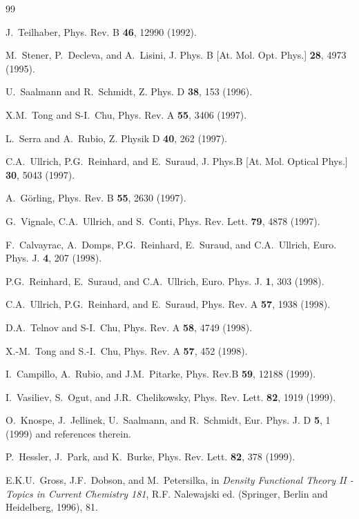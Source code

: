 \documentclass[aps,preprint]{revtex4}%
\begin{document}
\begin{thebibliography}{99}                                                                                               %


J.~Teilhaber, Phys. Rev. B \textbf{46}, 12990 (1992).

M.~Stener, P.~Decleva, and A.~Lisini, J. Phys. B [At. Mol.
Opt. Phys.] \textbf{28}, 4973 (1995).

U.~Saalmann and R.~Schmidt, Z. Phys. D \textbf{38}, 153 (1996).

X.M.~Tong and S-I.~Chu, Phys. Rev. A \textbf{55}, 3406 (1997).

L.~Serra and A.~Rubio, Z. Physik D \textbf{40}, 262 (1997).

C.A.~Ullrich, P.G.~Reinhard, and E.~Suraud, J. Phys.B [At.
Mol. Optical Phys.] \textbf{30}, 5043 (1997).

A.~G\"orling, Phys. Rev. B \textbf{55}, 2630 (1997).

G.~Vignale, C.A.~Ullrich, and S.~Conti, Phys. Rev. Lett.
\textbf{79}, 4878 (1997).

F.~Calvayrac, A.~Domps, P.G.~Reinhard, E.~Suraud, and
C.A.~Ullrich, Euro. Phys. J. \textbf{4}, 207 (1998).

P.G.~Reinhard, E.~Suraud, and C.A.~Ullrich, Euro. Phys.
J. \textbf{1}, 303 (1998).

C.A.~Ullrich, P.G.~Reinhard, and E.~Suraud, Phys. Rev. A
\textbf{57}, 1938 (1998).

D.A.~Telnov and S-I.~Chu, Phys. Rev. A \textbf{58}, 4749 (1998).

X.-M.~Tong and S.-I.~Chu, Phys. Rev. A \textbf{57}, 452 (1998).

I.~Campillo, A.~Rubio, and J.M.~Pitarke, Phys. Rev.B
\textbf{59}, 12188 (1999).

I.~Vasiliev, S.~Ogut, and J.R.~Chelikowsky, Phys. Rev.
Lett. \textbf{82}, 1919 (1999).

O.~Knospe, J.~Jellinek, U.~Saalmann, and R.~Schmidt, Eur.
Phys. J. D \textbf{5}, 1 (1999) and references therein.

P.~Hessler, J.~Park, and K.~Burke, Phys. Rev. Lett.
\textbf{82}, 378 (1999).

E.K.U.~Gross, J.F.~Dobson, and M.~Petersilka, in
\textit{Density Functional Theory II - Topics in Current Chemistry 181}, R.F.
Nalewajski ed. (Springer, Berlin and Heidelberg, 1996), 81.


\end{thebibliography}
\end{document}
